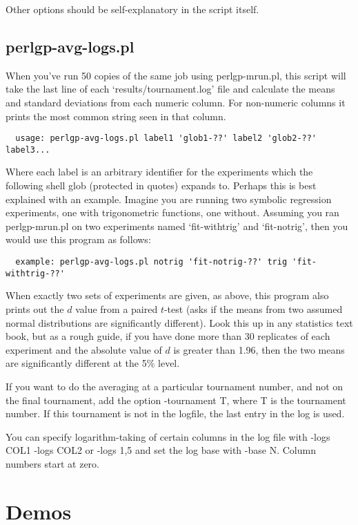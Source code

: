 \documentclass[a4paper]{article}
\begin{document}
Other options should be self-explanatory in the script itself.

\subsection{perlgp-avg-logs.pl}

When you've run 50 copies of the same job using perlgp-mrun.pl, this
script will take the last line of each `results/tournament.log' file
and calculate the means and standard deviations from each numeric
column.  For non-numeric columns it prints the most common string seen
in that column.

\begin{verbatim}
  usage: perlgp-avg-logs.pl label1 'glob1-??' label2 'glob2-??' label3...
\end{verbatim}

Where each label is an arbitrary identifier for the experiments which
the following shell glob (protected in quotes) expands to.  Perhaps
this is best explained with an example.  Imagine you are running two
symbolic regression experiments, one with trigonometric functions, one
without.  Assuming you ran perlgp-mrun.pl on two experiments named
`fit-withtrig' and `fit-notrig', then you would use this program as follows:

\begin{verbatim}
  example: perlgp-avg-logs.pl notrig 'fit-notrig-??' trig 'fit-withtrig-??'
\end{verbatim}

When exactly two sets of experiments are given, as above, this program
also prints out the $d$ value from a paired $t$-test (asks if the
means from two assumed normal distributions are significantly
different).  Look this up in any statistics text book, but as a rough
guide, if you have done more than 30 replicates of each experiment and
the absolute value of $d$ is greater than 1.96, then the two means are
significantly different at the 5\% level.

If you want to do the averaging at a particular tournament number, and
not on the final tournament, add the option -tournament T, where T is
the tournament number.  If this tournament is not in the logfile, the
last entry in the log is used.

You can specify logarithm-taking of certain columns in the log file with
-logs COL1 -logs COL2 or -logs 1,5 and set the log base with -base N.
Column numbers start at zero.

\section{Demos}\label{Demos}
\end{document}
